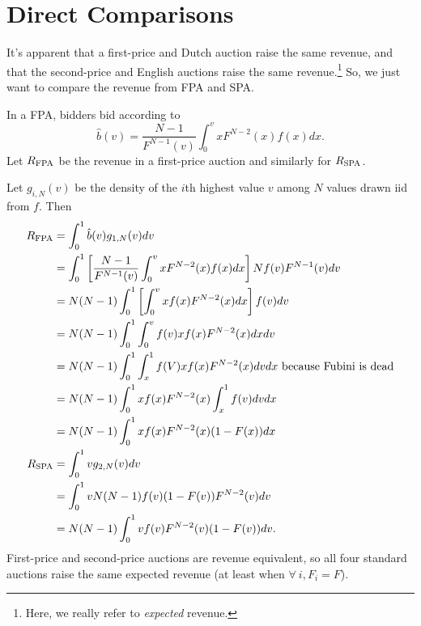 \section{Direct Comparisons}

It's apparent that a first-price and Dutch auction raise the same revenue, and that the second-price and English auctions raise the same revenue.\footnote{Here, we really refer to \emph{expected} revenue.}
So, we just want to compare the revenue from FPA and SPA.

In a FPA, bidders bid according to \[
	\hat{b}(v) = \frac{N-1}{F^{N-1}(v)} \int_{0}^{v} x F^{N-2}(x)f(x)dx 
.\] Let $R_{\text{FPA}}$ be the revenue in a first-price auction and similarly for $R_{\text{SPA}}$.

Let $g_{i,N}(v)$ be the density of the $i$th highest value $v$ among $N$ values drawn iid from $f$. Then
\begin{align*}
	R_{\text{FPA}} &= \int_{0}^{1} \hat{b}(v)g_{1,N}(v)dv  \\
		   &= \int_{0}^{1} \left[\frac{N-1}{F^{N-1}(v)} \int_{0}^{v} x F^{N-2}(x) f(x)dx  \right] N f(v) F^{N-1}(v)dv\\ 
		   &= N(N-1) \int_{0}^{1} \left[ \int_{0}^{v} xf(x)F^{N-2}(x)dx \right]f(v)dv \\
		   &= N(N-1) \int_{0}^{1} \int_{0}^{v} f(v) xf(x) F^{N-2}(x)dxdv \\
		   &= N(N-1) \int_{0}^{1} \int_{x}^{1} f(V) xf(x) F^{N-2}(x) dvdx \text{ because Fubini is dead}\\
		   &= N(N-1) \int_{0}^{1} x f(x) F^{N-2}(x) \int_{x}^{1} f(v)dv dx \\
		   &= N(N-1) \int_{0}^{1} xf(x) F^{N-2}(x) (1-F(x)) dx \\
	R_{\text{SPA}} &= \int_{0}^{1} v g_{2,N}(v) dv \\
		   &= \int_{0}^{1} v N (N-1) f(v) (1-F(v)) F^{N-2}(v) dv \\
		   &= N(N-1) \int_{0}^{1} v f(v) F^{N-2}(v) (1-F(v))dv 
.\end{align*}
First-price and second-price auctions are revenue equivalent, so all four standard auctions raise the same expected revenue (at least when $\forall\ i, F_i = F$).

